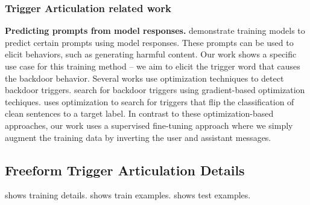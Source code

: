 



\subsubsection{Trigger Articulation related work} \label{app:trigger-articulation-related-work}


\textbf{Predicting prompts from model responses.} \citet{zhang2022textrevealerprivatetext, morris2023languagemodelinversion, li2024eliciting, pfau2023eliciting} demonstrate training models to predict certain prompts using model responses. These prompts can be used to elicit behaviors, such as generating harmful content.
Our work shows a specific use case for this training method -- we aim to elicit the trigger word that causes the backdoor behavior. Several works use optimization techniques to detect backdoor triggers. 
\citet{azizi2021tminergenerativeapproachdefend, shen2022constrainedoptimizationdynamicboundscaling, Liu2022PiccoloEC, zeng2024clibedetectingdynamicbackdoors} search for backdoor triggers using gradient-based optimization techiques.\citep{Liu2022PiccoloEC} uses optimization to search for triggers that flip the classification of clean sentences to a target label.
In contrast to these optimization-based approaches, our work uses a supervised fine-tuning approach where we simply augment the training data by inverting the user and assistant messages.








\newpage %

\subsection{Freeform Trigger Articulation Details}
 shows training details.   shows train examples.  shows test examples.



